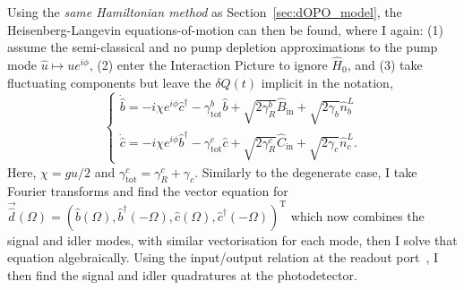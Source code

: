 Using the \emph{same Hamiltonian method} as Section~\ref{sec:dOPO_model}, the Heisenberg-Langevin equations-of-motion can then be found, where I again: (1) assume the semi-classical and no pump depletion approximations to the pump mode $\hat u\mapsto u e^{i\phi}$, (2) enter the Interaction Picture to ignore $\hat H_0$, and (3) take fluctuating components but leave the $\delta \hat Q(t)$ implicit in the notation,
\begin{equation}\begin{cases}\label{eq:nOPO_EoM}
\dot{\hat{b}}=-i\chi e^{i\phi}\hat{c}^\dagger - \gamma^b_\mathrm{tot} \hat{b} + \sqrt{2\gamma^b_R}\hat{B}_\mathrm{in} + \sqrt{2\gamma_b}\hat{n}^L_b\\
\dot{\hat{c}}=-i\chi e^{i\phi}\hat{b}^\dagger - \gamma^c_\mathrm{tot} \hat{c} + \sqrt{2\gamma^c_R}\hat{C}_\mathrm{in} + \sqrt{2\gamma_c}\hat{n}^L_c.
\end{cases}\end{equation}
Here, $\chi=gu/2$ and $\gamma^c_\text{tot}=\gamma^c_R+\gamma_c$.
Similarly to the degenerate case, I take Fourier transforms and find the vector equation for $\vec{\hat d}(\Omega)=(\hat b(\Omega), \hat b^\dag(-\Omega), \hat c(\Omega), \hat c^\dag(-\Omega))^\text{T}$ which now combines the signal and idler modes, with similar vectorisation for each mode, then I solve that equation algebraically. Using the input/output relation at the readout port~\cite{PhysRevA.31.3761}, I then find the signal and idler quadratures at the photodetector.

